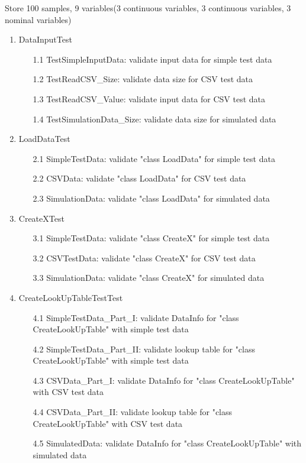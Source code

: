 \documentclass{article}
\begin{document}
Store 100 samples, 9 variables(3 continuous variables, 3 continuous variables, 3 nominal variables)
\begin{enumerate}
\item DataInputTest
\begin{enumerate}
\item[1.1] TestSimpleInputData: validate input data for simple test data
\item[1.2] TestReadCSV\_Size: validate data size for CSV test data
\item[1.3] TestReadCSV\_Value: validate input data for CSV test data
\item[1.4] TestSimulationData\_Size: validate data size for simulated data
\end{enumerate}
\item LoadDataTest
\begin{enumerate}
\item[2.1] SimpleTestData: validate "class LoadData" for simple test data
\item[2.2] CSVData: validate "class LoadData" for CSV test data
\item[2.3] SimulationData: validate "class LoadData" for simulated data
\end{enumerate}
\item CreateXTest
\begin{enumerate}
\item[3.1] SimpleTestData: validate "class CreateX" for simple test data
\item[3.2] CSVTestData: validate "class CreateX" for CSV test data
\item[3.3] SimulationData: validate "class CreateX" for simulated data
\end{enumerate}
\item CreateLookUpTableTestTest
\begin{enumerate}
\item[4.1] SimpleTestData\_Part\_I: validate DataInfo for "class CreateLookUpTable" with simple test data
\item[4.2] SimpleTestData\_Part\_II: validate lookup table for "class CreateLookUpTable" with simple test data
\item[4.3] CSVData\_Part\_I: validate DataInfo for "class CreateLookUpTable" with CSV test data
\item[4.4] CSVData\_Part\_II: validate lookup table for "class CreateLookUpTable" with CSV test data
\item[4.5] SimulatedData: validate DataInfo for "class CreateLookUpTable" with simulated data

\end{enumerate}
\end{enumerate}
\end{document}
